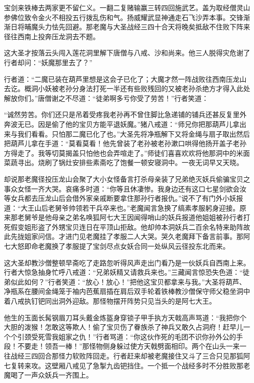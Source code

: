 \documentclass[12pt,UTF8]{ctexbook}
\begin{document}
宝剑来铁棒去两家更不留仁义。一翻二复赌输赢三转四回施武艺。盖为取经僧灵山参佛位致令金火不相投五行拨乱伤和气。扬威耀武显神通走石飞沙弄本事。交锋渐渐日将晡魔头力怯先回避。那老魔与大圣战经三四十合天将晚矣抵敌不住败下阵来径往西南上投奔压龙洞去不题。

这大圣才按落云头闯入莲花洞里解下唐僧与八戒、沙和尚来。他三人脱得灾危谢了行者却问：“妖魔那里去了？”

行者道：“二魔已装在葫芦里想是这会子已化了；大魔才然一阵战败往西南压龙山去讫。概洞小妖被老孙分身法打死一半还有些败残回的又被老孙杀绝方才得入此处解放你们。”唐僧谢之不尽道：“徒弟啊多亏你受了劳苦！”行者笑道：

“诚然劳苦。你们还只是吊着受疼我老孙再不曾住脚比急递铺的铺兵还甚反复里外奔波无已。因是偷了他的宝贝方能平退妖魔。”猪八戒道：“师兄你把那葫芦儿拿出来与我们看看。只怕那二魔已化了也。”大圣先将净瓶解下又将金绳与扇子取出然后把葫芦儿拿在手道：“莫看莫看！他先曾装了老孙被老孙漱口哄得他扬开盖子老孙方得走了。我等切莫揭盖只怕他也会弄喧走了。”师徒们喜喜欢欢将他那洞中的米面菜蔬寻出。烧刷了锅灶安排些素斋吃了饱餐一顿安寝洞中。一夜无词早又天晓。

却说那老魔径投压龙山会聚了大小女怪备言打杀母亲装了兄弟绝灭妖兵偷骗宝贝之事众女怪一齐大哭。哀痛多时道：“你等且休凄惨。我身边还有这口七星剑欲会汝等女兵都去压龙山后会借外家亲戚断要拿住那孙行者报仇。”说不了有门外小妖报道：“大王山后老舅爷帅领若干兵卒来也。”老魔闻言急换了缟素孝服躬身迎接。原来那老舅爷是他母亲之弟名唤狐阿七大王因闻得哨山的妖兵报道他姐姐被孙行者打死假变姐形盗了外甥宝贝连日在平顶山拒敌。他却帅本洞妖兵二百余名特来助阵故此先拢姐家问信。才进门见老魔挂了孝服二人大哭。哭久老魔拜下备言前事。那阿七大怒即命老魔换了孝服提了宝剑尽点女妖合同一处纵风云径投东北而来。

这大圣却教沙僧整顿早斋吃了走路忽听得风声走出门看乃是一伙妖兵自西南上来。行者大惊急抽身忙呼八戒道：“兄弟妖精又请救兵来也。”三藏闻言惊恐失色道：“徒弟似此如何？”行者笑道：“放心！放心！”把他这宝贝都拿来与我。”大圣将葫芦、净瓶系在腰间金绳笼于袖内芭蕉扇插在肩后双手轮着铁棒教沙僧保守师父稳坐洞中着八戒执钉钯同出洞外迎敌。那怪物摆开阵势只见当头的是阿七大王。

他生的玉面长髯钢眉刀耳头戴金炼盔身穿锁子甲手执方天戟高声骂道：“我把你个大胆的泼猴！怎敢这等欺人！偷了宝贝伤了眷族杀了神兵又敢久占洞府！赶早儿一个个引颈受死雪我姐家之仇！”行者骂道：“你这伙作死的毛团不识你孙外公的手段！不要走！领吾一棒！”那怪物侧身躲过使方天戟劈面相印。两个在山头一来一往战经三四回合那怪力软败阵回走。行者赶来却被老魔接住又斗了三合只见那狐阿七复转来攻。这壁厢八戒见了急掣九齿钯挡住。一个抵一个战经多时不分胜败那老魔喝了一声众妖兵一齐围上。
\end{document}
